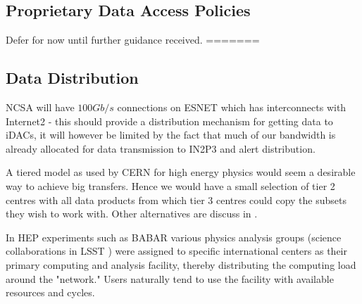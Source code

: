 \subsection{Proprietary Data Access Policies}
{\color{red}Defer for now until further guidance received.} \newline
=======

\subsection{Data Distribution} \label{sec:dist}

NCSA will have $100Gb/s$ connections  on ESNET which has interconnects with Internet2 - this should provide a distribution mechanism for getting data to iDACs, it will however be limited by the fact that much of our bandwidth is already allocated for data transmission to IN2P3 and alert distribution.

A tiered model as used by CERN for high energy physics would seem a desirable way to achieve big transfers. Hence we would have a small selection of tier 2 centres with all data products from which tier 3 centres could copy the subsets they wish to work with.  Other alternatives are discuss in .

In HEP experiments such as  BABAR various physics analysis groups (science collaborations in LSST ) were assigned to specific international centers as their primary computing and analysis facility, thereby distributing the computing load around the "network." Users naturally tend to use the facility with available resources and cycles.
~


